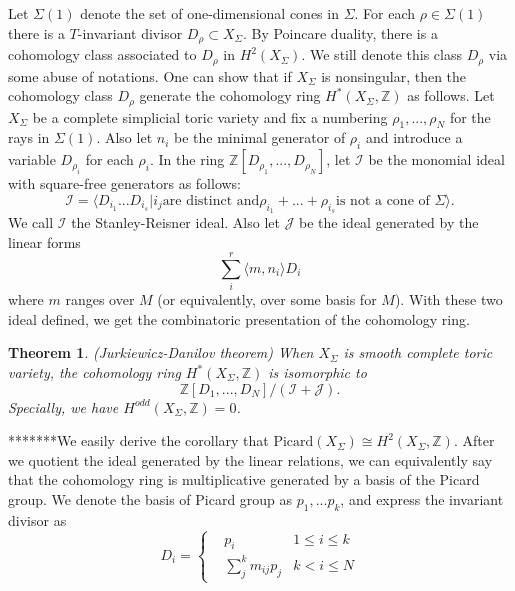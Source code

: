 \documentclass[11pt]{article}
\newtheorem{thm}{Theorem}[section]
\begin{document}
Let $\Sigma(1)$ denote the set of one-dimensional cones in $\Sigma$. For each $\rho\in \Sigma(1)$ there is a $T$-invariant divisor $D_{\rho}\subset X_\Sigma$. By Poincare duality, there is a cohomology class associated to $D_\rho$ in $H^2(X_\Sigma)$. We still denote this class $D_\rho$ via some abuse of notations. One can show that if $X_\Sigma$ is nonsingular, then the cohomology class $D_\rho$ generate the cohomology ring $H^*(X_\Sigma, \mathbb{Z})$ as follows.
Let $X_\Sigma$ be a complete simplicial toric variety and fix a numbering $\rho_1,...,\rho_N$ for the rays in $\Sigma(1)$. Also let $n_i$ be the minimal generator of $\rho_i$ and introduce a variable $D_{\rho_i}$ for each $\rho_i$. In the ring $\mathbb{Z}[D_{\rho_1},...,D_{\rho_N}]$, let $\mathcal{I}$ be the monomial ideal with square-free generators as follows:
\begin{equation*}
\mathcal{I} = \langle D_{i_1}...D_{i_s} | i_j \text{are distinct and} \rho_{i_1}+...+\rho_{i_s} \text{is not a cone of } \Sigma\rangle.
\end{equation*}
We call $\mathcal{I}$ the Stanley-Reisner ideal. Also let $\mathcal{J}$ be the ideal generated by the linear forms
\begin{equation*}
\sum_{i}^r\langle m, n_i \rangle D_i 
\end{equation*}
where $m$ ranges over $M$ (or equivalently, over some basis for $M$). With these two ideal defined, we get the combinatoric presentation of the cohomology ring.
\begin{thm}

(Jurkiewicz-Danilov theorem) When $X_\Sigma$ is smooth complete toric variety, the cohomology ring  $H^*(X_\Sigma, \mathbb{Z})$ is isomorphic to 
\begin{equation*}
\mathbb{Z}[D_1,...,D_N]/{(\mathcal{I}+\mathcal{J})}.
\end{equation*}
Specially, we have $H^{odd}(X_\Sigma,\mathbb{Z})=0$.
\end{thm}
*******We easily derive the corollary that $\text{Picard}(X_\Sigma)\cong H^2(X_{\Sigma},\mathbb{Z})$. After we quotient the ideal generated by the linear relations, we can equivalently say that the cohomology ring is multiplicative generated by a basis of the Picard group. We denote the basis of Picard group as $p_1,...p_k$, and express the invariant divisor as
$$
D_i=\left\{
\begin{aligned}
& p_i & 1\leq i\leq k\\
& \sum_j^k m_{i j} p_j  &k< i\leq N
\end{aligned}
\right.
$$
\end{document}
